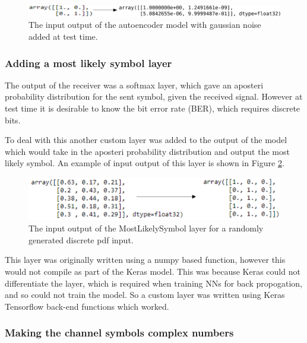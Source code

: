 \documentclass[12pt,onecolumn,letterpaper]{article}
\begin{document}
\begin{figure}[t]
   \centering
   \includegraphics[width=0.8\linewidth]{figures/ae1_1_with_noise.png}
   \caption{The input output of the autoencoder model with gaussian noise added at test time. }
\label{fig:CodeGaussianNoise2}
\end{figure}

\subsubsection{Adding a most likely symbol layer}

The output of the receiver was a softmax layer, which gave an aposteri probability distribution for the sent symbol, given the received signal. However at test time it is desirable to know the bit error rate (BER), which requires discrete bits.

To deal with this another custom layer was added to the output of the model which would take in the aposteri probability distribution and output the most likely symbol. An example of input output of this layer is shown in Figure \ref{fig:MostLikelySymbolLayer}.

\begin{figure}[t]
   \centering
   \includegraphics[width=0.8\linewidth]{figures/most_likely_symbol_io.PNG}
   \caption{The input output of the MostLikelySymbol layer for a randomly generated discrete pdf input. }
\label{fig:MostLikelySymbolLayer}
\end{figure}

This layer was originally written using a numpy based function, however this would not compile as part of the Keras model. This was because Keras could not differentiate the layer, which is required when training NNs for back propogation, and so could not train the model. So a custom layer was written using Keras Tensorflow back-end functions which worked.

\subsubsection{Making the channel symbols complex numbers}
\end{document}
